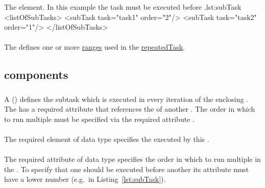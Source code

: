 \begin{myXmlLst}{The  element. In this example the task  must be executed before .}{lst:subTask}
<listOfSubTasks>
	<subTask task="task1" order="2"/> 
	<subTask task="task2" order="1"/> 
</listOfSubTasks>
\end{myXmlLst}

\paragraph*{}
\label{class:listOfRanges}
The  defines one or more \hyperref[class:range]{ranges} used in the \hyperref[class:repeatedTask]{repeatedTask}.


\subsection{ components}
\label{class:taskComponents}

\subsubsection{}
\label{class:subTask}
A  () defines the subtask which is executed in every iteration of the enclosing \RepeatedTask. The  has a required attribute \hyperref[sec:subTaskTask]{} that references the \hyperref[sec:id]{} of another \AbstractTask. The order in which to run multiple  must be specified via the required attribute \hyperref[sec:subTaskOrder]{}.  

\paragraph*{}
\label{sec:subTaskTask}
The required element  of data type \SIdRef specifies the \AbstractTask executed by this \SubTask.

\paragraph*{}
\label{sec:subTaskOrder}
The required attribute  of data type  specifies the order in which to run multiple  in the \hyperref[class:listOfSubTasks]{}. To specify that one  should be executed before another its  attribute must have a lower number (e.g.\ in Listing~\ref{lst:subTask}).

